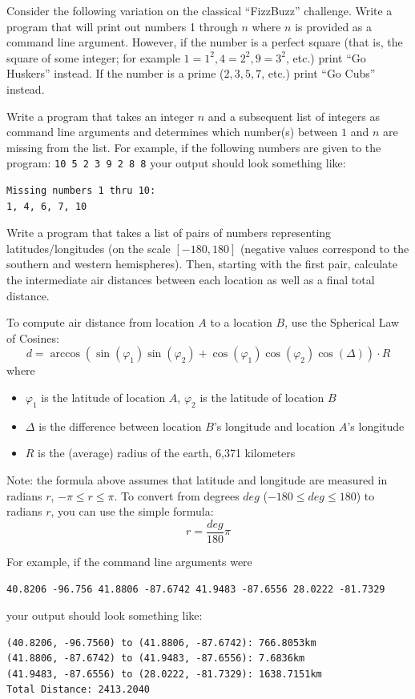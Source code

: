 \begin{exer}
Consider the following variation on the classical ``FizzBuzz'' challenge.
Write a program that will print out numbers 1 through $n$ where $n$ is provided
as a command line argument.  However, if the number is a perfect square 
(that is, the square of some integer; for example $1 = 1^2, 4 = 2^2, 9 = 3^2$, etc.) 
print ``Go Huskers'' instead.  If the number is a prime
($2, 3, 5, 7$, etc.) print ``Go Cubs'' instead.
\end{exer}

\begin{exer}
Write a program that takes an integer $n$ and a subsequent list
of integers as command line arguments and determines which number(s) 
between $1$ and $n$ are missing from the list.  For example, if the following
numbers are given to the program:
  \texttt{10 5 2 3 9 2 8 8}
your output should look something like:

\begin{verbatim}
Missing numbers 1 thru 10:
1, 4, 6, 7, 10
\end{verbatim}
\end{exer}

\begin{exer}
Write a program that takes a list of pairs of numbers representing 
latitudes/longitudes (on the scale $[-180, 180]$ (negative values correspond to the
southern and western hemispheres).  Then, starting with the first
pair, calculate the intermediate air distances between each location as well as a 
final total distance.

To compute air distance from location $A$ to a location $B$, use the Spherical Law of Cosines:
 $$d = \arccos{(\sin(\varphi_1) \sin(\varphi_2) + \cos(\varphi_1) \cos(\varphi_2) \cos(\Delta) )} \cdot R$$
where
\begin{itemize}
  \item $\varphi_1$ is the latitude of location $A$, $\varphi_2$ is the latitude of location $B$
  \item $\Delta$ is the difference between location $B$'s longitude and location $A$'s longitude
  \item $R$ is the (average) radius of the earth, 6,371 kilometers
\end{itemize}
Note: the formula above assumes that latitude and longitude are measured in radians $r$, $-\pi \leq r \leq \pi$.  
To convert from degrees $deg$ ($-180 \leq deg \leq 180$) to radians $r$, you can use the simple formula:
  $$r = \frac{deg}{180} \pi$$

For example, if the command line arguments were 

\texttt{40.8206 -96.756 41.8806 -87.6742 41.9483 -87.6556 28.0222 -81.7329}

your output should look something like:

\begin{verbatim}
(40.8206, -96.7560) to (41.8806, -87.6742): 766.8053km
(41.8806, -87.6742) to (41.9483, -87.6556): 7.6836km
(41.9483, -87.6556) to (28.0222, -81.7329): 1638.7151km
Total Distance: 2413.2040
\end{verbatim}
\end{exer}

